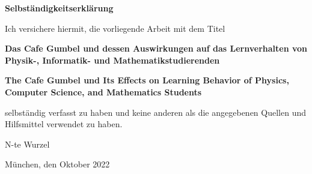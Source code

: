 \documentclass[a4paper,11pt,twoside,openright]{report}
\begin{document}



%



\cleardoublepage

\printbibliography
{} %

%
%



\clearpage{\pagestyle{empty}\cleardoublepage}
\thispagestyle{empty}



\vspace*{1cm}
{\huge \textbf{Selbst{\"a}ndigkeitserkl{\"a}rung}}\\
\vspace*{1.5cm}

Ich versichere hiermit, die vorliegende Arbeit mit dem Titel

\begin{center}
	\textbf{Das Cafe Gumbel und dessen Auswirkungen auf das Lernverhalten von Physik-, Informatik- und Mathematikstudierenden}\\
\end{center}
\begin{center}
	\textbf{The Cafe Gumbel und Its Effects on Learning Behavior of Physics, Computer Science, and Mathematics Students}
\end{center}

selbst{\"a}ndig verfasst zu haben und keine anderen als die angegebenen Quellen und Hilfsmittel verwendet zu haben.

\vspace*{3cm}

N-te Wurzel

\vspace*{1cm}
M{\"u}nchen, den \hspace*{2cm} Oktober 2022
\end{document}
